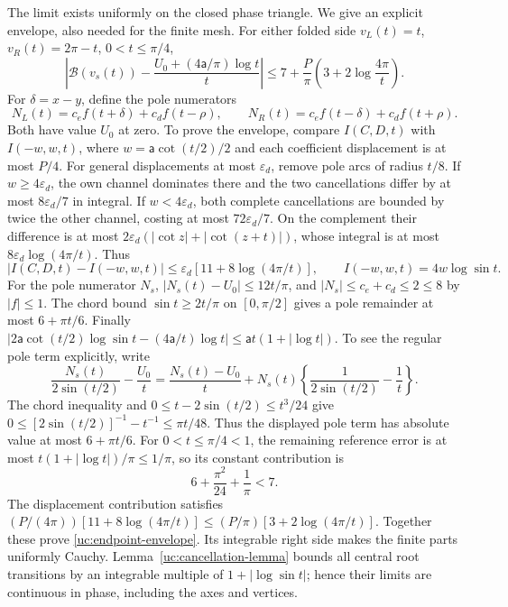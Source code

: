 The limit exists uniformly on the closed phase triangle. We give an
explicit envelope, also needed for the finite mesh. For either folded
side $v_L(t)=t$, $v_R(t)=2\pi-t$, $0<t\leq\pi/4$,
\begin{equation}\label{uc:endpoint-envelope}
 \left|\mathcal B(v_s(t))-
       \frac{U_0+(4\mathsf{a}/\pi)\log t}{t}\right|
 \leq7+\frac P\pi\left(3+2\log\frac{4\pi}{t}\right).
\end{equation}
For $\delta=x-y$, define the pole numerators
\[
 N_L(t)=c_ef(t+\delta)+c_df(t-\rho),\qquad
 N_R(t)=c_ef(t-\delta)+c_df(t+\rho).
\]
Both have value $U_0$ at zero. To prove the envelope, compare
$I(C,D,t)$ with $I(-w,w,t)$, where
$w=\mathsf{a}\cot(t/2)/2$ and each coefficient displacement is at most $P/4$.
For general displacements at most $\varepsilon_d$, remove pole arcs of
radius $t/8$. If $w\geq4\varepsilon_d$, the own channel dominates there
and the two cancellations differ by at most $8\varepsilon_d/7$ in
integral. If $w<4\varepsilon_d$, both complete cancellations are bounded
by twice the other channel, costing at most $72\varepsilon_d/7$.
On the complement their difference is at most
$2\varepsilon_d(|\cot z|+|\cot(z+t)|)$, whose integral is at most
$8\varepsilon_d\log(4\pi/t)$. Thus
\[
 |I(C,D,t)-I(-w,w,t)|\leq\varepsilon_d[11+8\log(4\pi/t)],
 \qquad I(-w,w,t)=4w\log\sin t.
\]
For the pole numerator $N_s$, $|N_s(t)-U_0|\leq12t/\pi$,
and $|N_s|\leq c_e+c_d\leq2\leq8$ by $|f|\leq1$. The chord bound $\sin t\geq2t/\pi$ on $[0,\pi/2]$ gives a pole remainder at most
$6+\pi t/6$. Finally
$|2\mathsf{a}\cot(t/2)\log\sin t-(4\mathsf{a}/t)\log t|
\leq \mathsf{a}t(1+|\log t|)$. To see the regular pole term explicitly, write
\[
 \frac{N_s(t)}{2\sin(t/2)}-\frac{U_0}{t}
 =\frac{N_s(t)-U_0}{t}
  +N_s(t)\left\{\frac1{2\sin(t/2)}-\frac1t\right\}.
\]
The chord inequality and $0\leq t-2\sin(t/2)\leq t^3/24$ give
$0\leq[2\sin(t/2)]^{-1}-t^{-1}\leq\pi t/48$.
Thus the displayed pole term has absolute value at most $6+\pi t/6$.
For $0<t\leq\pi/4<1$, the remaining reference error is at most
$t(1+|\log t|)/\pi\leq1/\pi$, so its constant contribution is
\[
 6+\frac{\pi^2}{24}+\frac1\pi<7.
\]
The displacement contribution satisfies
$(P/(4\pi))[11+8\log(4\pi/t)]\leq(P/\pi)[3+2\log(4\pi/t)]$.
Together these prove \eqref{uc:endpoint-envelope}.
Its integrable right side makes the finite parts uniformly Cauchy.
Lemma~\ref{uc:cancellation-lemma} bounds all central root transitions by an
integrable multiple of $1+|\log\sin t|$; hence their limits are
continuous in phase, including the axes and vertices.

